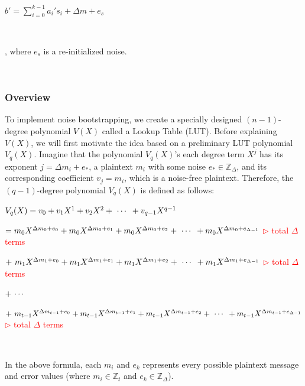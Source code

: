 $ $

$b' = \sum\limits_{i=0}^{k-1} a_i's_i + \Delta m + e_s$

$ $

, where $e_s$ is a re-initialized noise. 

$ $
\subsubsection{Overview}
\label{subsec:bootstrapping-overview}

To implement noise bootstrapping, we create a specially designed $(n-1)$-degree polynomial $V(X)$ called a Lookup Table (LUT). Before explaining $V(X)$, we will first motivate the idea based on a preliminary LUT polynomial $V_q(X)$. Imagine that the polynomial $V_q(X)$'s each degree term $X^{j}$ has its exponent $j = \Delta m_i + e_*$, a plaintext $m_i$ with some noise $e_* \in \mathbb{Z}_{\Delta}$, and its corresponding coefficient $v_{j} = m_i$, which is a noise-free plaintext. Therefore, the $(q-1)$-degree polynomial $V_q(X)$ is defined as follows:

$V_q(X) = v_0 + v_1X^1 + v_2X^2 + \text{ } \text{$\cdots$} \text{ } + v_{q-1}X^{q-1}$

\text{ } $= m_0X^{\Delta m_0 + e_0} + m_0X^{\Delta m_0 + e_1} + m_0X^{\Delta m_0 + e_2} + \text{ } \text{$\cdots$} \text{ } + m_0X^{\Delta m_0 + e_{\Delta - 1}}$ \textcolor{red}{ $\rhd$ total $\Delta$ terms}

\text{ } $ + \text{ } m_1X^{\Delta m_1 + e_0} + m_1X^{\Delta m_1 + e_1} + m_1X^{\Delta m_1 + e_2} + \text{ } \text{$\cdots$} \text{ } + m_1X^{\Delta m_1 + e_{\Delta - 1}}$ \textcolor{red}{ $\rhd$ total $\Delta$ terms}

\text{ } $ + \text{ } \text{$\cdots$} \text{ } $

\text{ } $ + \text{ } m_{t - 1}X^{\Delta m_{t - 1} + e_0} + m_{t - 1}X^{\Delta m_{t - 1} + e_1} + m_{t - 1}X^{\Delta m_{t - 1} + e_2} + \text{ } \text{$\cdots$} \text{ } + m_{t - 1}X^{\Delta m_{t - 1} + e_{\Delta - 1}}$ \textcolor{red}{ $\rhd$ total $\Delta$ terms}

$ $

In the above formula, each $m_i$ and $e_k$ represents every possible plaintext message and error values (where $m_i \in \mathbb{Z}_t$ and $e_k \in \mathbb{Z}_{\Delta}$). %


